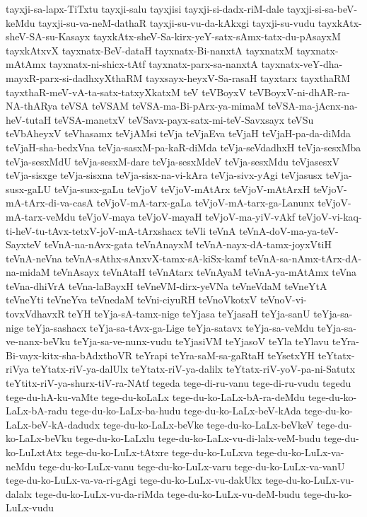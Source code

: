 {tayxji-sa-lapx-TiTxtu
tayxji-salu
tayxjisi
tayxji-si-dadx-riM-dale
tayxji-si-sa-beV-keMdu
tayxji-su-va-neM-dathaR
tayxji-su-vu-da-kAkxgi
tayxji-su-vudu
tayxkAtx-sheV-SA-su-Kasayx
tayxkAtx-sheV-Sa-kirx-yeY-satx-sAmx-tatx-du-pAsayxM
tayxkAtxvX
tayxnatx-BeV-dataH
tayxnatx-Bi-nanxtA
tayxnatxM
tayxnatx-mAtAmx
tayxnatx-ni-shicx-tAtf
tayxnatx-parx-sa-nanxtA
tayxnatx-veY-dha-mayxR-parx-si-dadhxyXthaRM
tayxsayx-heyxV-Sa-rasaH
tayxtarx
tayxthaRM
tayxthaR-meV-vA-ta-satx-tatxyXkatxM
teV
teVBoyxV
teVBoyxV-ni-dhAR-ra-NA-thARya
teVSA
teVSAM
teVSA-ma-Bi-pArx-ya-mimaM
teVSA-ma-jAcnx-na-heV-tutaH
teVSA-manetxV
teVSavx-payx-satx-mi-teV-Savxsayx
teVSu
teVbAheyxV
teVhasamx
teVjAMsi
teVja
teVjaEva
teVjaH
teVjaH-pa-da-diMda
teVjaH-sha-bedxVna
teVja-sasxM-pa-kaR-diMda
teVja-seVdadhxH
teVja-sesxMba
teVja-sesxMdU
teVja-sesxM-dare
teVja-sesxMdeV
teVja-sesxMdu
teVjasesxV
teVja-sisxge
teVja-sisxna
teVja-sisx-na-vi-kAra
teVja-sivx-yAgi
teVjasusx
teVja-susx-gaLU
teVja-susx-gaLu
teVjoV
teVjoV-mAtArx
teVjoV-mAtArxH
teVjoV-mA-tArx-di-va-casA
teVjoV-mA-tarx-gaLa
teVjoV-mA-tarx-ga-Lanunx
teVjoV-mA-tarx-veMdu
teVjoV-maya
teVjoV-mayaH
teVjoV-ma-yiV-vAkf
teVjoV-vi-kaq-ti-heV-tu-tAvx-tetxV-joV-mA-tArxshacx
teVli
teVnA
teVnA-doV-ma-ya-teV-SayxteV
teVnA-na-nAvx-gata
teVnAnayxM
teVnA-nayx-dA-tamx-joyxVtiH
teVnA-neVna
teVnA-sAthx-sAnxvX-tamx-sA-kiSx-kamf
teVnA-sa-nAmx-tArx-dA-na-midaM
teVnAsayx
teVnAtaH
teVnAtarx
teVnAyaM
teVnA-ya-mAtAmx
teVna
teVna-dhiVrA
teVna-laBayxH
teVneVM-dirx-yeVNa
teVneVdaM
teVneYtA
teVneYti
teVneYva
teVnedaM
teVni-ciyuRH
teVnoVkotxV
teVnoV-vi-tovxVdhavxR
teYH
teYja-sA-tamx-nige
teYjasa
teYjasaH
teYja-sanU
teYja-sa-nige
teYja-sashacx
teYja-sa-tAvx-ga-Lige
teYja-satavx
teYja-sa-veMdu
teYja-sa-ve-nanx-beVku
teYja-sa-ve-nunx-vudu
teYjasiVM
teYjasoV
teYla
teYlavu
teYra-Bi-vayx-kitx-sha-bAdxthoVR
teYrapi
teYra-saM-sa-gaRtaH
teYsetxYH
teYtatx-riVya
teYtatx-riV-ya-dalUlx
teYtatx-riV-ya-dalilx
teYtatx-riV-yoV-pa-ni-Satutx
teYtitx-riV-ya-shurx-tiV-ra-NAtf
tegeda
tege-di-ru-vanu
tege-di-ru-vudu
tegedu
tege-du-hA-ku-vaMte
tege-du-koLaLx
tege-du-ko-LaLx-bA-ra-deMdu
tege-du-ko-LaLx-bA-radu
tege-du-ko-LaLx-ba-hudu
tege-du-ko-LaLx-beV-kAda
tege-du-ko-LaLx-beV-kA-dadudx
tege-du-ko-LaLx-beVke
tege-du-ko-LaLx-beVkeV
tege-du-ko-LaLx-beVku
tege-du-ko-LaLxlu
tege-du-ko-LaLx-vu-di-lalx-veM-budu
tege-du-ko-LuLxtAtx
tege-du-ko-LuLx-tAtxre
tege-du-ko-LuLxva
tege-du-ko-LuLx-va-neMdu
tege-du-ko-LuLx-vanu
tege-du-ko-LuLx-varu
tege-du-ko-LuLx-va-vanU
tege-du-ko-LuLx-va-va-ri-gAgi
tege-du-ko-LuLx-vu-dakUkx
tege-du-ko-LuLx-vu-dalalx
tege-du-ko-LuLx-vu-da-riMda
tege-du-ko-LuLx-vu-deM-budu
tege-du-ko-LuLx-vudu
}
